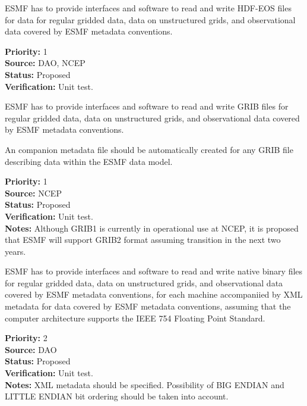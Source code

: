
ESMF has to provide interfaces and software to read and write HDF-EOS
files for data for regular gridded data, data on unstructured grids, and 
observational data  covered by ESMF metadata conventions.


\begin{reqlist}
{\bf Priority:} 1 \\
{\bf Source:} DAO, NCEP \\
{\bf Status:} Proposed \\
{\bf Verification:} Unit test. \\
\end{reqlist}


ESMF has to provide interfaces and software to read and write GRIB
files for regular gridded data, data on unstructured grids, and observational 
data  covered by ESMF metadata conventions.

An companion metadata file should be automatically created for any GRIB file  
describing data within the ESMF data model.

\begin{reqlist}
{\bf Priority:} 1 \\
{\bf Source:} NCEP \\
{\bf Status:} Proposed \\
{\bf Verification:} Unit test. \\
{\bf Notes:} Although GRIB1 is currently in operational use at NCEP,
it is proposed that ESMF will support GRIB2 format assuming transition
in the next two years.
\end{reqlist}


ESMF has to provide interfaces and software to read and write native
binary files for regular gridded data, data on unstructured grids, and 
observational data  covered by ESMF metadata conventions, for each machine 
accompaniied by XML metadata for data covered by ESMF metadata conventions,
assuming that the computer architecture supports the IEEE 754 Floating
Point Standard. 

\begin{reqlist}
{\bf Priority:} 2 \\
{\bf Source:} DAO \\
{\bf Status:} Proposed \\
{\bf Verification:} Unit test. \\
{\bf Notes:} XML metadata should be specified. Possibility of BIG
ENDIAN and LITTLE ENDIAN bit ordering should be taken into account.
\end{reqlist}

